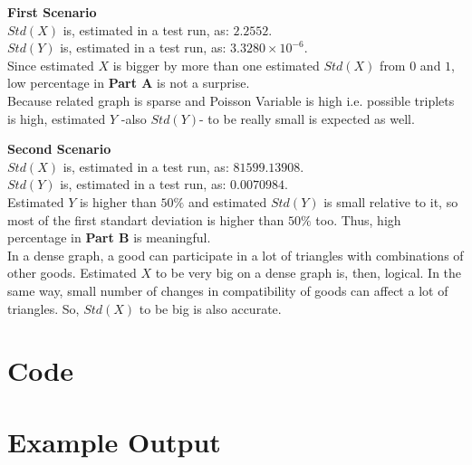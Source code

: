\documentclass{article}
\begin{document}
            \begin{minipage}{0.45\textwidth}
                \vspace{-1.32cm}
                \textbf{First Scenario} \\
                $Std(X)$ is, estimated in a test run, as: $2.2552$. \\
                $Std(Y)$ is, estimated in a test run, as: $3.3280 \times 10^{-6}$.\\
                
                Since estimated $X$ is bigger by more than one estimated $Std(X)$ from $0$ and $1$, low percentage in \textbf{Part A} is not a surprise.\\
                Because related graph is sparse and Poisson Variable is high i.e. possible triplets is high, estimated $Y$ -also $Std(Y)$- to be really small is expected as well.
            \end{minipage}
            \hfill \vline \hfill
            \begin{minipage}{0.45\textwidth}
                \textbf{Second Scenario} \\
                $Std(X)$ is, estimated in a test run, as: $81599.13908$. \\
                $Std(Y)$ is, estimated in a test run, as: $0.0070984$. \\

                Estimated $Y$ is higher than $50\%$ and estimated $Std(Y)$ is small relative to it, so most of the first standart deviation is higher than $50\%$ too. Thus, high percentage in \textbf{Part B} is meaningful.\\
                In a dense graph, a good can participate in a lot of triangles with combinations of other goods. Estimated $X$ to be very big on a dense graph is, then, logical. In the same way, small number of changes in compatibility of goods can affect a lot of triangles. So, $Std(X)$ to be big is also accurate.

            \end{minipage}

    
    
    \newpage
    \section*{Code}
        
    \section*{Example Output}
        
\end{document}
